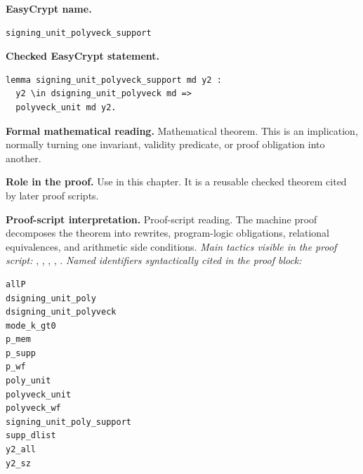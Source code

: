 \begin{formaltheorem}
\noindent\textbf{EasyCrypt name.}
\begin{lstlisting}[language=EasyCrypt,basicstyle=\ttfamily\scriptsize]
signing_unit_polyveck_support
\end{lstlisting}
\noindent\textbf{Checked EasyCrypt statement.}
\begin{lstlisting}[language=EasyCrypt,basicstyle=\ttfamily\scriptsize]
lemma signing_unit_polyveck_support md y2 :
  y2 \in dsigning_unit_polyveck md =>
  polyveck_unit md y2.
\end{lstlisting}
\noindent\textbf{Formal mathematical reading.}
Mathematical theorem. This is an implication, normally turning one invariant, validity predicate, or proof obligation into another.

\noindent\textbf{Role in the proof.}
Use in this chapter. It is a reusable checked theorem cited by later proof scripts.

\noindent\textbf{Proof-script interpretation.}
Proof-script reading. The machine proof decomposes the theorem into rewrites, program-logic obligations, relational equivalences, and arithmetic side conditions.
\emph{Main tactics visible in the proof script:} , , , , .
\emph{Named identifiers syntactically cited in the proof block:}
\begin{lstlisting}[language=EasyCrypt,basicstyle=\ttfamily\scriptsize]
allP
dsigning_unit_poly
dsigning_unit_polyveck
mode_k_gt0
p_mem
p_supp
p_wf
poly_unit
polyveck_unit
polyveck_wf
signing_unit_poly_support
supp_dlist
y2_all
y2_sz
\end{lstlisting}

\end{formaltheorem}

